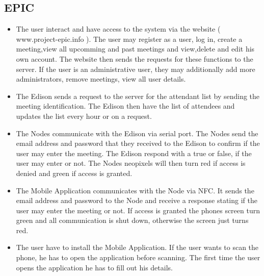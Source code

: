 \documentclass[a4paper,12pt,titlepage]{article}
\begin{document}
\subsection{EPIC}
	\begin{itemize}
		\item The user interact and have access to the system via the website ( www.project-epic.info ). The user may register as a user, log in, create a meeting,view all upcomming and past meetings and view,delete and edit his own account. The website then sends the requests for these functions to the server. If the user is an administrative user, they may additionally add more administrators, remove meetings, view all user details.
\item The Edison sends a request to the server for the attendant list by sending the meeting identification. The Edison then have the list of attendees and updates the list every hour or on a request.
\item The Nodes communicate with the Edison via serial port. The Nodes send the email address and password that they received to the Edison to confirm if the user may enter the meeting. The Edison respond with a true or false, if the user may enter or not. The Nodes neopixels will then turn red if access is denied and green if access is granted.
\item The Mobile Application communicates with the Node via NFC. It sends the email address and password to the Node and receive a response stating if the user may enter the meeting or not. If access is granted the phones screen turn green and all communication is shut down, otherwise the screen just turns red.
\item The  user have to install the Mobile Application. If the user wants to scan the phone, he has to open the application before scanning. The first time the user opens the application he has to fill out his details. 

	\end{itemize}
\end{document}
